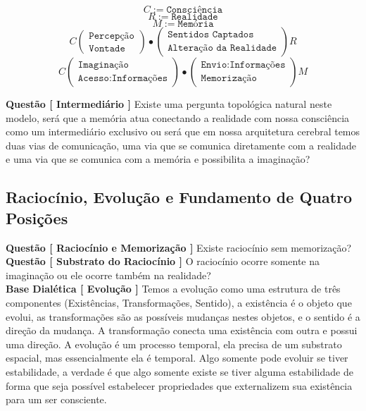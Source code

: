 $$ C := \texttt{Consciência}$$
$$ R := \texttt{Realidade} $$
$$ M := \texttt{Memória} $$
$$ C \left(  \begin{array}{cc}
\texttt{Percepção} \\ \texttt{Vontade}
\end{array} \right)  \bullet \left( \begin{array}{cc}
\texttt{Sentidos Captados} \\ \texttt{Alteração da Realidade}
\end{array} \right) R $$
$$ C \left(  \begin{array}{cc}
\texttt{Imaginação} \\ \texttt{Acesso:Informações}
\end{array} \right)  \bullet \left( \begin{array}{cc}
\texttt{Envio:Informações} \\ \texttt{Memorização}
\end{array} \right) M $$
\hrulefill

\textbf{Questão [ Intermediário ]} Existe uma pergunta topológica natural neste modelo, será que a memória atua conectando a realidade com nossa consciência como um intermediário exclusivo ou será que em nossa arquitetura cerebral temos duas vias de comunicação, uma via que se comunica diretamente com a realidade e uma via que se comunica com a memória e possibilita a imaginação?


\subsection{Raciocínio, Evolução e Fundamento de Quatro Posições}

\hspace{\baselineskip}

\textbf{Questão [ Raciocínio e Memorização ]} Existe raciocínio sem memorização?\\

\textbf{Questão [ Substrato do Raciocínio ]} O raciocínio ocorre somente na imaginação ou ele ocorre também na realidade?\\

\textbf{Base Dialética [ Evolução ]} Temos a evolução como uma estrutura de três componentes (Existências, Transformações, Sentido), a existência é o objeto que evolui, as transformações são as possíveis mudanças nestes objetos, e o sentido é a direção da mudança. A transformação conecta uma existência com outra e possui uma direção. A evolução é um processo temporal, ela precisa de um substrato espacial, mas essencialmente ela é temporal. Algo somente pode evoluir se tiver estabilidade, a verdade é que algo somente existe se tiver alguma estabilidade de forma que seja possível estabelecer propriedades que externalizem sua existência para um ser consciente.


